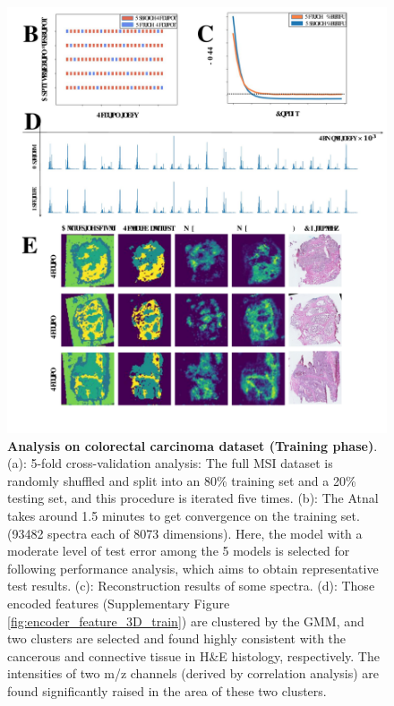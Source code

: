 \documentclass{WileyMSP-template}
\begin{document}
\begin{figure}[]
  \centering
  \includegraphics[width=\linewidth]{./pic/corlor_train.pdf}
\captionsetup{justification=raggedright,singlelinecheck=false}
\caption
  {
    \textbf{Analysis on colorectal carcinoma dataset (Training phase)}.  
    (a): 5-fold cross-validation analysis: The full MSI dataset is randomly shuffled and split 
    into an 80\% training set and a 20\% testing set, 
    and this procedure is iterated five times. 
    (b): The Atnal takes around 1.5 minutes to get convergence on the training set. 
    (93482 spectra each of 8073 dimensions). Here, the model with a moderate level of test error among the 5 models is selected for following performance analysis, which aims to obtain representative test results. 
    (c): Reconstruction results of some spectra. 
    (d): Those encoded features (Supplementary Figure \ref{fig:encoder_feature_3D_train}) 
    are clustered by the GMM, 
    and two clusters are selected  
    and found highly consistent with the cancerous and connective tissue in H\&E histology, respectively. 
    The intensities of two m/z channels (derived by correlation analysis) are found significantly raised in the area of these two clusters. 
  }
\label{fig:Training}
\end{figure}
\end{document}
